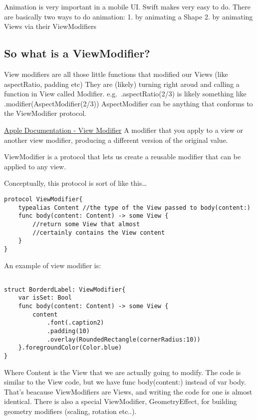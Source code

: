 \documentclass[]{article}
\begin{document}
Animation is very important in a mobile UI. Swift makes very easy to do.
There are basically two ways to do animation: 1. by animating a Shape 2.
by animating Views via their ViewModifiers

\hypertarget{so-what-is-a-viewmodifier}{%
\subsection{So what is a
ViewModifier?}\label{so-what-is-a-viewmodifier}}

View modifiers are all those little functions that modified our Views
(like aspectRatio, padding etc) They are (likely) turning right aroud
and calling a function in View called Modifier. e.g.~.aspectRatio(2/3)
is likely something like .modifier(AspectModifier(2/3)) AspectModifier
can be anything that conforms to the ViewModifier protocol.

\href{https://developer.apple.com/documentation/swiftui/viewmodifier}{Apple
Documentation - View Modifier} A modifier that you apply to a view or
another view modifier, producing a different version of the original
value.

ViewModifier is a protocol that lets us create a reusable modifier that
can be applied to any view.

Conceptually, this protocol is sort of like this\ldots{}

\begin{verbatim}
protocol ViewModifier{
    typealias Content //the type of the View passed to body(content:)
    func body(content: Content) -> some View {
        //return some View that almost 
        //certainly contains the View content
    }
}
\end{verbatim}

An example of view modifier is:

\begin{verbatim}

struct BorderdLabel: ViewModifier{
    var isSet: Bool
    func body(content: Content) -> some View {
        content
            .font(.caption2)
            .padding(10)
            .overlay(RoundedRectangle(cornerRadius:10))
    }.foregroundColor(Color.blue)
}
\end{verbatim}

Where Content is the View that we are actually going to modify. The code
is similar to the View code, but we have func body(content:) instead of
var body. That's beacause ViewModifiers are Views, and writing the code
for one is almost identical. There is also a special ViewModifier,
GeometryEffect, for building geometry modifiers (scaling, rotation
etc..).
\end{document}
